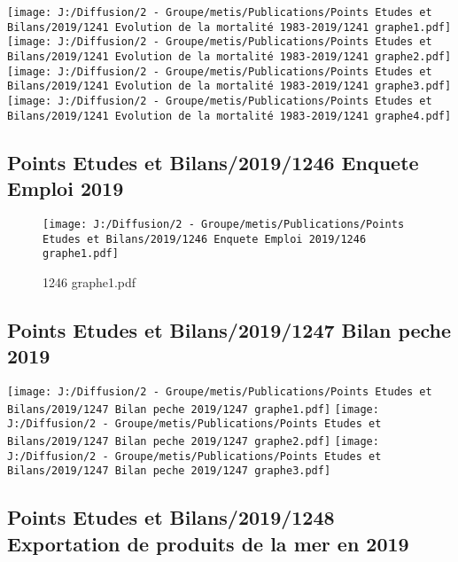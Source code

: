 \documentclass[
]{article}
\begin{document}
\texttt{[image: J:/Diffusion/2 - Groupe/metis/Publications/Points Etudes et Bilans/2019/1241 Evolution de la mortalité 1983-2019/1241 graphe1.pdf]}
\texttt{[image: J:/Diffusion/2 - Groupe/metis/Publications/Points Etudes et Bilans/2019/1241 Evolution de la mortalité 1983-2019/1241 graphe2.pdf]}
\texttt{[image: J:/Diffusion/2 - Groupe/metis/Publications/Points Etudes et Bilans/2019/1241 Evolution de la mortalité 1983-2019/1241 graphe3.pdf]}
\texttt{[image: J:/Diffusion/2 - Groupe/metis/Publications/Points Etudes et Bilans/2019/1241 Evolution de la mortalité 1983-2019/1241 graphe4.pdf]}

\hypertarget{points-etudes-et-bilans20191246-enquete-emploi-2019}{%
\subsection{Points Etudes et Bilans/2019/1246 Enquete Emploi
2019}\label{points-etudes-et-bilans20191246-enquete-emploi-2019}}

\begin{figure}
\centering
\texttt{[image: J:/Diffusion/2 - Groupe/metis/Publications/Points Etudes et Bilans/2019/1246 Enquete Emploi 2019/1246 graphe1.pdf]}
\caption{1246 graphe1.pdf}
\end{figure}

\hypertarget{points-etudes-et-bilans20191247-bilan-peche-2019}{%
\subsection{Points Etudes et Bilans/2019/1247 Bilan peche
2019}\label{points-etudes-et-bilans20191247-bilan-peche-2019}}

\texttt{[image: J:/Diffusion/2 - Groupe/metis/Publications/Points Etudes et Bilans/2019/1247 Bilan peche 2019/1247 graphe1.pdf]}
\texttt{[image: J:/Diffusion/2 - Groupe/metis/Publications/Points Etudes et Bilans/2019/1247 Bilan peche 2019/1247 graphe2.pdf]}
\texttt{[image: J:/Diffusion/2 - Groupe/metis/Publications/Points Etudes et Bilans/2019/1247 Bilan peche 2019/1247 graphe3.pdf]}

\hypertarget{points-etudes-et-bilans20191248-exportation-de-produits-de-la-mer-en-2019}{%
\subsection{Points Etudes et Bilans/2019/1248 Exportation de produits de
la mer en
2019}\label{points-etudes-et-bilans20191248-exportation-de-produits-de-la-mer-en-2019}}
\end{document}
